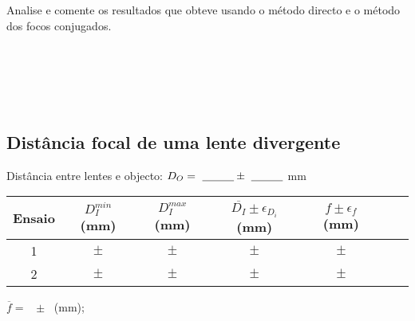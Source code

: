 \documentclass[a4paper,12pt]{article}  %
\begin{document}
Analise e comente os resultados que obteve usando o método directo e o método dos focos conjugados.

\noindent\underline{\makebox[\textwidth][r]{~}} \\
\noindent\underline{\makebox[\textwidth][r]{~}} \\
\noindent\underline{\makebox[\textwidth][r]{~}} \\
\noindent\underline{\makebox[\textwidth][r]{~}} \\


\subsection{\sf Distância focal de uma lente divergente}

Distância entre lentes e objecto: $D_O=~\underline{\makebox[1cm][r]{~}}\pm~\underline{\makebox[1cm][r]{~}}$ mm

\begin{center}
	\begin{tabular}{|c|c|c|c|c|c|c|}
	\hline
	 Ensaio &
	  $ D_{I}^{min}$ (mm) & 
	  $ D_I^{max}$ (mm) & 
	  $ \overline{D_{I}}\pm\epsilon_{D_i}$ (mm) &
	  $f\pm\epsilon_f$ (mm)\\
	\hline \hline
	1 & $\quad \pm \quad$ &  $\quad \pm \quad$ & $\quad \pm \quad$& $\qquad \pm \qquad$ \\ \cline{1-5}
	2 & $\quad \pm \quad$ & $\quad \pm \quad$ & $\quad \pm \quad$& $\quad \pm \quad$ \\ \hline
	  \end{tabular}
\end{center}
 $\overline{f} =$ ~\underline{\makebox[1cm][r]{~}}$\pm$~\underline{\makebox[1cm][r]{~}} (mm); 



\end{document}
